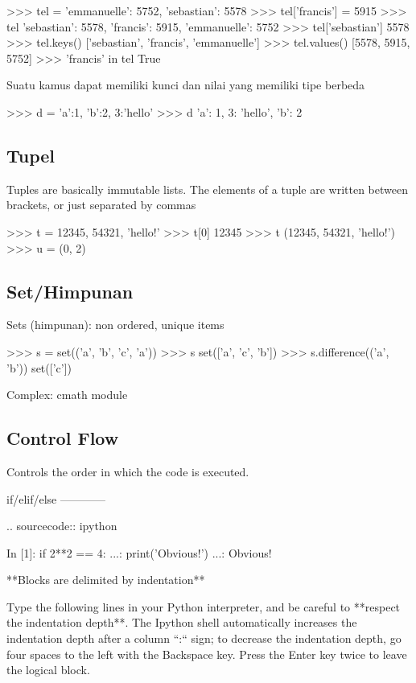 \documentclass[a4paper,11pt]{extarticle}
\begin{document}
\begin{pyconcode}
>>> tel = {'emmanuelle': 5752, 'sebastian': 5578}
>>> tel['francis'] = 5915 
>>> tel
{'sebastian': 5578, 'francis': 5915, 'emmanuelle': 5752}
>>> tel['sebastian']
5578
>>> tel.keys()
['sebastian', 'francis', 'emmanuelle']
>>> tel.values()
[5578, 5915, 5752]
>>> 'francis' in tel
True
\end{pyconcode}

Suatu kamus dapat memiliki kunci dan nilai yang memiliki tipe berbeda
\begin{pyconcode}
>>> d = {'a':1, 'b':2, 3:'hello'}
>>> d
{'a': 1, 3: 'hello', 'b': 2}
\end{pyconcode}

\subsection{Tupel}

Tuples are basically immutable lists. The elements of a tuple are written
between brackets, or just separated by commas
\begin{pyconcode}
>>> t = 12345, 54321, 'hello!'
>>> t[0]
12345
>>> t
(12345, 54321, 'hello!')
>>> u = (0, 2)
\end{pyconcode}

\subsection{Set/Himpunan}

Sets (himpunan): non ordered, unique items
\begin{pyconcode}
>>> s = set(('a', 'b', 'c', 'a'))
>>> s
set(['a', 'c', 'b'])
>>> s.difference(('a', 'b'))
set(['c'])
\end{pyconcode}

Complex: cmath module


\subsection{Control Flow}

Controls the order in which the code is executed.

if/elif/else
------------

.. sourcecode:: ipython
  
    In [1]: if 2**2 == 4:
       ...:     print('Obvious!')
       ...: 
    Obvious!


**Blocks are delimited by indentation**

Type the following lines in your Python interpreter, and be careful to
**respect the indentation depth**. The Ipython shell automatically
increases the indentation depth after a column ``:`` sign; to
decrease the indentation depth, go four spaces to the left with the
Backspace key. Press the Enter key twice to leave the logical block.
\end{document}
